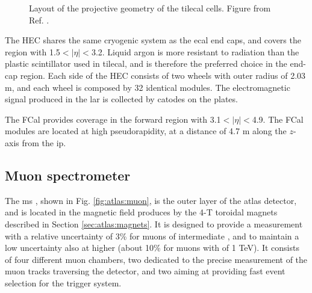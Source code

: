 \begin{figure}[ht]
\centering
{}
\caption{Layout of the projective geometry of the \gls{tilecal} cells. Figure from Ref. \cite{atlas:atlas}.}
\label{fig:atlas:tile_cells}
\end{figure}

The HEC shares the same cryogenic system as the \gls{ecal} end caps, and covers the region with 1.5$<|\eta|<$3.2. Liquid argon is more resistant to radiation than the plastic scintillator used in \gls{tilecal}, and is therefore the preferred choice in the end-cap region. Each side of the HEC consists of two wheels with outer radius of 2.03 m, and each wheel is composed by 32 identical modules. The electromagnetic signal produced in the \gls{lar} is collected by catodes on the plates. 

The FCal provides coverage in the forward region with 3.1$<|\eta|<$4.9. The FCal modules are located at high pseudorapidity, at a distance of 4.7 m along the $z$-axis from the \gls{ip}.


\subsection{Muon spectrometer}

The \gls{ms} \cite{ATLAS:1997ad}, shown in Fig. \ref{fig:atlas:muon}, is the outer layer of the \gls{atlas} detector, and is located in the magnetic field produces by the 4-T toroidal magnets described in Section \ref{sec:atlas:magnets}. It is designed to provide a \pt measurement with a relative uncertainty of 3\% for muons of intermediate \pt, and to maintain a low uncertainty also at higher \pt (about 10\% for muons with \pt of 1 TeV). It consists of four different muon chambers, two dedicated to the precise measurement of the muon tracks traversing the detector, and two aiming at providing fast event selection for the trigger system. 

